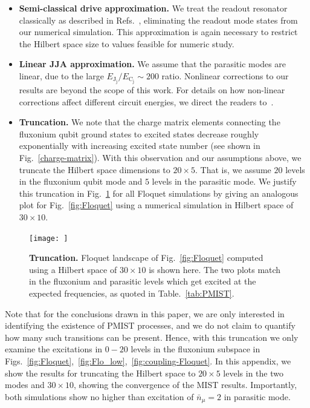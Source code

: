 \documentclass[%
reprint,
superscriptaddress,
 amsmath,amssymb,
 aps,
 prx,
longbibliography,
floatfix,
]{revtex4-2}
\begin{document}
{\begin{itemize}
    \item \textbf{Semi-classical drive approximation.}  We treat the readout resonator classically as described in Refs.~\cite{xiao2023diagrammatic,dumas2024unified,cohen2023reminiscence,khezri2023measurement}, eliminating the readout mode states from our numerical simulation. This approximation is again necessary to restrict the Hilbert space size to values feasible for numeric study.
    
    \item \textbf{Linear JJA approximation.} We assume that the parasitic modes are linear, due to the large $E_{\textrm{J}_\textrm{j}}/E_{\textrm{C}_\textrm{j}} \sim 200$ ratio. Nonlinear corrections to our results are beyond the scope of this work. For details on how non-linear corrections affect different circuit energies, we direct the readers to~\cite{viola2015collective}. 
    \item \textbf{Truncation.} We note that the charge matrix elements connecting the fluxonium qubit ground states to excited states decrease roughly exponentially with increasing excited state number (see shown in Fig.~\ref{charge-matrix}). With this observation and our assumptions above, we truncate the Hilbert space dimensions to $20\times 5$. That is, we assume $20$ levels in the fluxonium qubit mode and $5$ levels in the parasitic mode. We justify this truncation in Fig.~\ref{fig:truncation} for all Floquet simulations by giving an analogous plot for Fig.~\ref{fig:Floquet} using a numerical simulation in Hilbert space of $30\times 10$.
    \end{itemize}
    \begin{figure}[t]
        \centering
        \texttt{[image: ]}
        \caption{{\bf Truncation.} Floquet landscape of Fig.~\ref{fig:Floquet} computed using a Hilbert space of $30\times 10$ is shown here. The two plots match in the fluxonium and parasitic levels which get excited at the expected frequencies, as quoted in Table.~\ref{tab:PMIST}.}
        \label{fig:truncation}
    \end{figure}
    Note that for the conclusions drawn in this paper, we are only interested in identifying the existence of PMIST processes, and we do not claim to quantify how many such transitions can be present. Hence, with this truncation we only examine the excitations in $0-20$ levels in the fluxonium subspace in Figs.~\ref{fig:Floquet},~\ref{fig:Flo_low},~\ref{fig:coupling-Floquet}. In this appendix, we show the results for truncating the Hilbert space to $20
    \times 5$ levels in the two modes and $30
    \times 10$, showing the convergence of the MIST results. Importantly, both simulations show no higher than excitation of $\bar n_\mu=2$ in parasitic mode.

}
\end{document}
